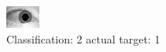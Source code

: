\begin{figure}[h!]
\begin{center}
\includegraphics[width=0.60\columnwidth]{figures/ID1474_class_2_target_1.png}
\end{center}
\caption{ Classification: 2 actual target: 1}
\label{fig:ID1474_class_2_target_1}
\end{figure}
